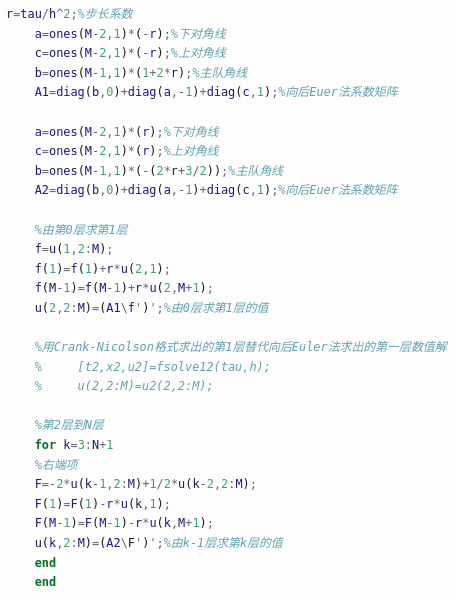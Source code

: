 \documentclass[withoutpreface,bwprint]{cumcmthesis} %
\begin{document}
\begin{appendices}
\begin{lstlisting}[language=matlab]
	r=tau/h^2;%步长系数
	a=ones(M-2,1)*(-r);%下对角线
	c=ones(M-2,1)*(-r);%上对角线
	b=ones(M-1,1)*(1+2*r);%主队角线
	A1=diag(b,0)+diag(a,-1)+diag(c,1);%向后Euer法系数矩阵
	
	a=ones(M-2,1)*(r);%下对角线
	c=ones(M-2,1)*(r);%上对角线
	b=ones(M-1,1)*(-(2*r+3/2));%主队角线
	A2=diag(b,0)+diag(a,-1)+diag(c,1);%向后Euer法系数矩阵
	
	%由第0层求第1层
	f=u(1,2:M);
	f(1)=f(1)+r*u(2,1);
	f(M-1)=f(M-1)+r*u(2,M+1);
	u(2,2:M)=(A1\f')';%由0层求第1层的值
	
	%用Crank-Nicolson格式求出的第1层替代向后Euler法求出的第一层数值解
	%     [t2,x2,u2]=fsolve12(tau,h);
	%     u(2,2:M)=u2(2,2:M);
	
	%第2层到N层
	for k=3:N+1
	%右端项
	F=-2*u(k-1,2:M)+1/2*u(k-2,2:M);
	F(1)=F(1)-r*u(k,1);
	F(M-1)=F(M-1)-r*u(k,M+1);
	u(k,2:M)=(A2\F')';%由k-1层求第k层的值
	end
	end
	\end{lstlisting}
\end{appendices}
\end{document}
